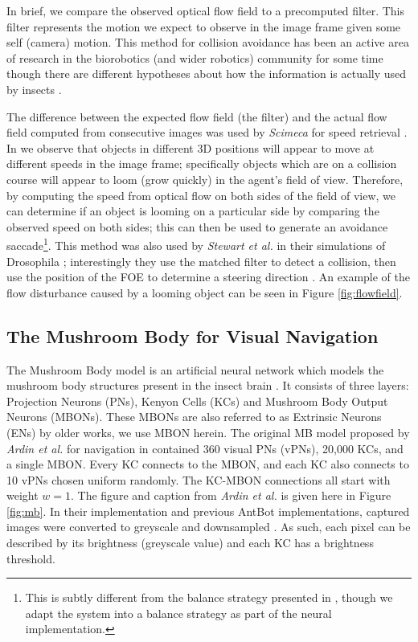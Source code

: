 \documentclass[a4paper,11pt,twoside,openright]{article}
\begin{document}
In brief, we compare the observed optical flow field to a precomputed
filter. This filter represents the motion we expect to observe in the
image frame given some self (camera) motion. This method for collision
avoidance has been an active area of research in the biorobotics (and
wider robotics) community for some time though there are different
hypotheses about how the information is actually used by insects
\cite{Julien2017}.\newline\par

The difference between the expected flow field (the filter) and the
actual flow field computed from consecutive images was used by
\textit{Scimeca} for speed retrieval \cite{Scimeca2017}. In
\cite{Mitchell2018} we observe that objects in different 3D positions
will appear to move at different speeds in the image frame;
specifically objects which are on a collision course will appear to
loom (grow quickly) in the agent's field of view. Therefore, by
computing the speed from optical flow on both sides of the field of
view, we can determine if an object is looming on a particular side by
comparing the observed speed on both sides; this can then be used to
generate an avoidance saccade\footnote{This is subtly different from
  the balance strategy presented in \cite{Julien2017}, though we adapt
  the system into a balance strategy as part of the neural
  implementation.}. This method was also used by \textit{Stewart et
  al.} in their simulations of Drosophila \cite{Stewart2010};
interestingly they use the matched filter to detect a collision, then
use the position of the FOE to determine a steering direction
\cite{Stewart2010}. An example of the flow disturbance caused by a
looming object can be seen in Figure \ref{fig:flowfield}.
\newline\par

\subsection{ The Mushroom Body for Visual Navigation } \label{MBBackground}
The Mushroom Body model is an artificial neural network which models
the mushroom body structures present in the insect brain
\cite{Ardin2016}. It consists of three layers: Projection Neurons
(PNs), Kenyon Cells (KCs) and Mushroom Body Output Neurons
(MBONs). These MBONs are also referred to as Extrinsic Neurons (ENs)
by older works, we use MBON herein. The original MB model proposed by
\textit{Ardin et al.} for navigation in \cite{Ardin2016} contained 360
visual PNs (vPNs), 20,000 KCs, and a single MBON. Every KC connects to
the MBON, and each KC also connects to 10 vPNs chosen uniform
randomly. The KC-MBON connections all start with weight $w=1$. The
figure and caption from \textit{Ardin et al.} is given here in Figure
\ref{fig:mb}. In their implementation and previous AntBot
implementations, captured images were converted to greyscale and
downsampled \cite{Ardin2016, Eberding2016, Zhang2017,
  Mitchell2018}. As such, each pixel can be described by its
brightness (greyscale value) and each KC has a brightness threshold.
\newline
\par
\end{document}
